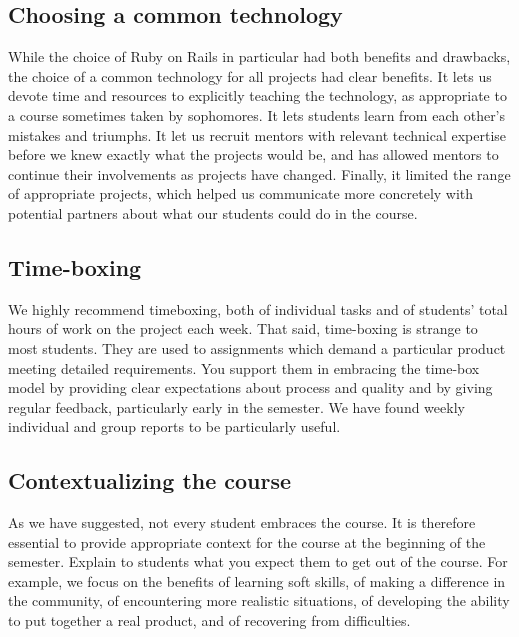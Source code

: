 \subsection{Choosing a common technology}

While the choice of Ruby on Rails in particular had both benefits and 
drawbacks, the choice of a common technology for all projects had clear 
benefits.  It lets us devote time and resources to explicitly teaching 
the technology, as appropriate to a course sometimes taken by sophomores. 
It lets students learn from each other's mistakes and triumphs.  
It let us recruit mentors with relevant technical expertise before we 
knew exactly what the projects would be, and has allowed mentors to continue 
their involvements as projects have changed.
Finally, it limited the range of appropriate projects, which helped us 
communicate more concretely with potential partners about what our 
students could do in the course.

\subsection{Time-boxing}

We highly recommend timeboxing, both of individual tasks and of students' 
total hours of work on the project each week.
That said, 
time-boxing is strange to most students.  They are used to assignments 
which demand a particular
product meeting detailed requirements.  You support them in embracing the
time-box model by providing clear expectations about process and quality and
by giving regular feedback, particularly early in the semester.  We have
found weekly individual and group reports to be particularly useful.

\subsection{Contextualizing the course}

As we have suggested, not every student embraces the course.  It
is therefore essential to provide appropriate context for the course at
the beginning of the semester.  Explain to students what you expect them
to get out of the course.  For example, we focus on the benefits of learning
soft skills, of making a difference in the community, of encountering
more realistic situations, of developing the ability to put together a
real product, and of recovering from difficulties.
